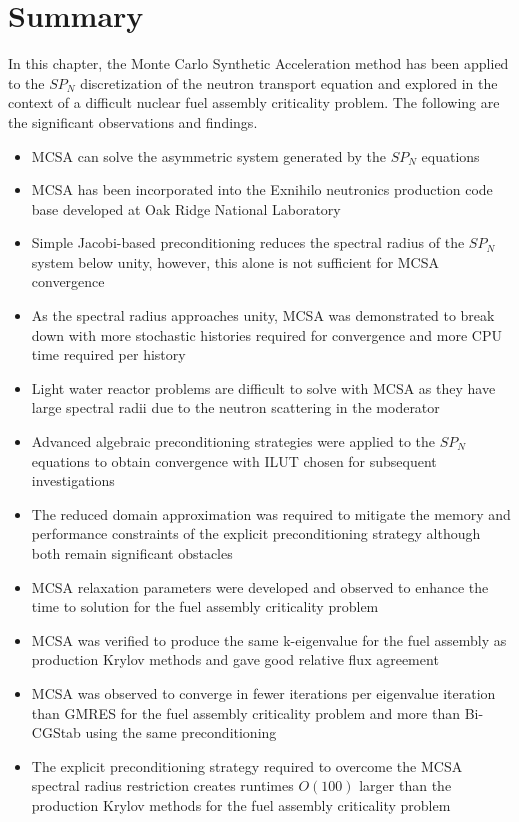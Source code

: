 \clearpage

\section{Summary\ }
\label{sec:mc_summary}

In this chapter, the Monte Carlo Synthetic Acceleration method has
been applied to the $SP_N$ discretization of the neutron transport
equation and explored in the context of a difficult nuclear fuel
assembly criticality problem. The following are the significant
observations and findings.

\begin{itemize}
\item MCSA can solve the asymmetric system generated by the $SP_N$
  equations
\item MCSA has been incorporated into the Exnihilo neutronics
  production code base developed at Oak Ridge National Laboratory
\item Simple Jacobi-based preconditioning reduces the spectral radius
  of the $SP_N$ system below unity, however, this alone is not
  sufficient for MCSA convergence
\item As the spectral radius approaches unity, MCSA was demonstrated
  to break down with more stochastic histories required for
  convergence and more CPU time required per history
\item Light water reactor problems are difficult to solve with MCSA as
  they have large spectral radii due to the neutron scattering in the
  moderator
\item Advanced algebraic preconditioning strategies were applied to
  the $SP_N$ equations to obtain convergence with ILUT chosen for
  subsequent investigations
\item The reduced domain approximation was required to mitigate the
  memory and performance constraints of the explicit preconditioning
  strategy although both remain significant obstacles
\item MCSA relaxation parameters were developed and observed to
  enhance the time to solution for the fuel assembly criticality
  problem
\item MCSA was verified to produce the same k-eigenvalue for the fuel
  assembly as production Krylov methods and gave good relative flux
  agreement
\item MCSA was observed to converge in fewer iterations per eigenvalue
  iteration than GMRES for the fuel assembly criticality problem and
  more than Bi-CGStab using the same preconditioning
\item The explicit preconditioning strategy required to overcome the
  MCSA spectral radius restriction creates runtimes $O(100)$ larger
  than the production Krylov methods for the fuel assembly criticality
  problem
\end{itemize}
